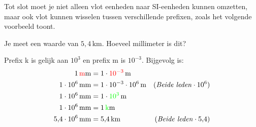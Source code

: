 \documentclass{ximera}
\begin{document}
Tot slot moet je niet alleen vlot eenheden naar SI-eenheden kunnen omzetten, maar ook vlot kunnen wisselen tussen verschillende prefixen, zoals het volgende voorbeeld toont.

\begin{example}[foldable=true,title={Voorbeeld: kilometer naar millimeter omzetten}]\nl
    Je meet een waarde van $5{,}4 \, \mathrm{km}$. Hoeveel millimeter is dit?

    \begin{solution}\nl
    Prefix k is gelijk aan $10^{3}$ en prefix m is $10^{-3}$. Bijgevolg is:
    \begin{align*}
    1 \, \textcolor{red}{\mathrm{m}}\mathrm{m} & = 1 \cdot \textcolor{red}{10^{-3}} \, \mathrm{m} & \\
    1 \cdot 10^{6} \, \mathrm{mm} & = 1 \cdot 10^{-3} \cdot 10^{6} \, \mathrm{m} & (\text{\textit{Beide leden}} \cdot 10^{6}) \\
    1 \cdot 10^{6} \, \mathrm{mm} & = 1 \cdot \textcolor{green}{10^{3}} \, \mathrm{m} & \\
    1 \cdot 10^{6} \, \mathrm{mm} & = 1 \, \textcolor{green}{\mathrm{k}}\mathrm{m} & \\
    5{,}4 \cdot 10^{6} \, \mathrm{mm} & = 5{,}4 \, \mathrm{km} & (\text{\textit{Beide leden}} \cdot 5{,}4) \\
    \end{align*}
    \end{solution}
\end{example}
\end{document}
